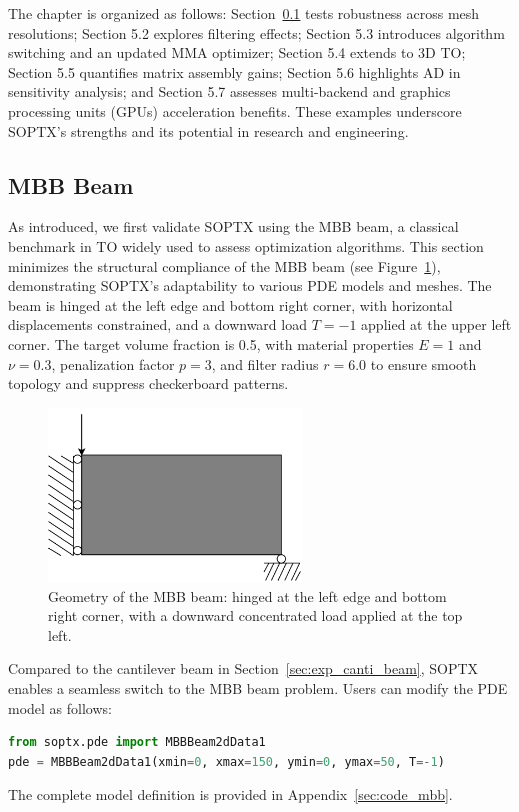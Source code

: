\documentclass[mathpazo]{cicp}
\begin{document}
The chapter is organized as follows: Section~\ref{sec:exp_mbb_beam} tests robustness across mesh resolutions; Section 5.2 explores filtering effects; Section 5.3 introduces algorithm switching and an updated MMA optimizer; Section 5.4 extends to 3D TO; Section 5.5 quantifies matrix assembly gains; Section 5.6 highlights AD in sensitivity analysis; and Section 5.7 assesses multi-backend and graphics processing units (GPUs) acceleration benefits. These examples underscore SOPTX's strengths and its potential in research and engineering.

\subsection{MBB Beam}\label{sec:exp_mbb_beam}
As introduced, we first validate SOPTX using the MBB beam, a classical benchmark in TO widely used to assess optimization algorithms. This section minimizes the structural compliance of the MBB beam (see Figure~\ref{fig:mbb_beam}), demonstrating SOPTX's adaptability to various PDE models and meshes. The beam is hinged at the left edge and bottom right corner, with horizontal displacements constrained, and a downward load $T = -1$ applied at the upper left corner. The target volume fraction is 0.5, with material properties $E = 1$ and $\nu = 0.3$, penalization factor $p = 3$, and filter radius $r = 6.0$ to ensure smooth topology and suppress checkerboard patterns.
\begin{figure}[htb]
	\centering
	\includegraphics[width=0.6\textwidth]{figures/mbb_2d.png}
	\caption{Geometry of the MBB beam: hinged at the left edge and bottom right corner, with a downward concentrated load applied at the top left.}
	\label{fig:mbb_beam}
\end{figure}

Compared to the cantilever beam in Section~\ref{sec:exp_canti_beam}, SOPTX enables a seamless switch to the MBB beam problem. Users can modify the PDE model as follows:
\begin{lstlisting}[language=Python]
from soptx.pde import MBBBeam2dData1
pde = MBBBeam2dData1(xmin=0, xmax=150, ymin=0, ymax=50, T=-1)
\end{lstlisting}
The complete model definition is provided in Appendix~\ref{sec:code_mbb}.
\end{document}
